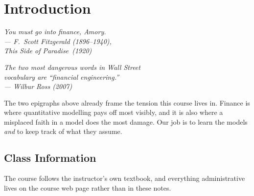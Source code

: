 \chapter{Introduction}


\begin{flushright}
	\itshape You must go into finance, Amory.\\
	\upshape --- F.~Scott Fitzgerald (1896--1940),\\
	\itshape This Side of Paradise\upshape\ (1920)

	\medskip

	\itshape The two most dangerous words in Wall Street\\
	vocabulary are ``financial engineering.''\\
	\upshape --- Wilbur Ross (2007)
\end{flushright}

\bigskip

\suppstart
\noindent The two epigraphs above already frame the tension this course lives in.
Finance is where quantitative modelling pays off most visibly, and it is also where a misplaced faith in a model does the most damage.
Our job is to learn the models \emph{and} to keep track of what they assume.
\suppend

\section{Class Information}


The course follows the instructor's own textbook, and everything administrative lives on the course web page rather than in these notes.

